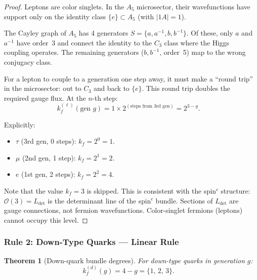 \documentclass[11pt,a4paper]{article}
\newtheorem{theorem}{Theorem}
\theoremstyle{definition}
\theoremstyle{remark}
\begin{document}
\begin{proof}
Leptons are color singlets.  In the $A_5$ microsector, their wavefunctions
have support only on the identity class $\{e\} \subset A_5$ (with
$|1A| = 1$).

The Cayley graph of $A_5$ has 4 generators $S = \{a, a^{-1}, b, b^{-1}\}$.
Of these, only $a$ and $a^{-1}$ have order~3 and connect the identity
to the $C_3$ class where the Higgs coupling operates.  The remaining
generators ($b, b^{-1}$, order~5) map to the wrong conjugacy class.

For a lepton to couple to a generation one step away, it must make a
``round trip'' in the microsector: out to $C_3$ and back to $\{e\}$.
This round trip doubles the required gauge flux.  At the $n$-th step:
\[
k_f^{(\ell)}(\text{gen } g) = 1 \times 2^{(\text{steps from 3rd gen})}
= 2^{3-g}.
\]

Explicitly:
\begin{itemize}
\item $\tau$ (3rd gen, 0 steps): $k_f = 2^0 = 1$.
\item $\mu$ (2nd gen, 1 step): $k_f = 2^1 = 2$.
\item $e$ (1st gen, 2 steps): $k_f = 2^2 = 4$.
\end{itemize}

Note that the value $k_f = 3$ is skipped.  This is consistent with
the spin$^c$ structure: $\mathcal{O}(3) = L_{\det}$ is the determinant
line of the spin$^c$ bundle.  Sections of $L_{\det}$ are gauge
connections, not fermion wavefunctions.  Color-singlet fermions
(leptons) cannot occupy this level.
\end{proof}

\subsubsection{Rule 2: Down-Type Quarks --- Linear Rule}

\begin{theorem}[Down-quark bundle degrees]
\label{thm:down}
For down-type quarks in generation $g$:
\begin{equation}
\boxed{k_f^{(d)}(g) = 4 - g = \{1,\, 2,\, 3\}.}
\end{equation}
\end{theorem}
\end{document}
